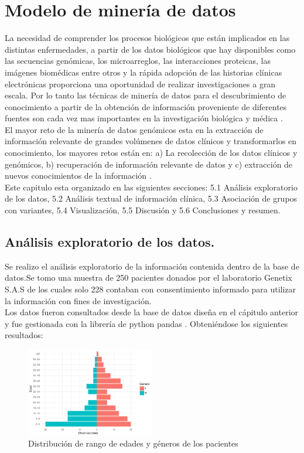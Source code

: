 \chapter{Modelo de minería de datos}

La necesidad de comprender los procesos biológicos que están implicados en las distintas enfermedades, a partir de los datos biológicos que hay disponibles como las secuencias genómicas, los microarreglos, las interacciones proteicas, las imágenes biomédicas entre otros y la rápida adopción de las historias clínicas electrónicas proporciona una oportunidad de realizar investigaciones a gran escala. Por lo tanto las técnicas de minería de datos para el descubrimiento de conocimiento a partir de la obtención de información proveniente de diferentes fuentes son cada vez mas importantes en la investigación biológica y médica \cite{Wang2017}.\\

El mayor reto de la minería de datos genómicos esta en la extracción de información relevante de grandes volúmenes de datos clínicos y transformarlos en conocimiento, los mayores retos están en: a) La recolección de los datos clínicos y genómicos, b) recuperación de información relevante de datos y c) extracción de nuevos conocimientos de la información \cite{Farid2016}. \\  


Este capitulo esta organizado en las siguientes secciones: 5.1 Análisis exploratorio de los datos, 5.2 Análisis textual de información clínica, 5.3 Asociación de grupos con variantes, 5.4 Visualización, 5.5 Discusión y 5.6 Conclusiones y resumen. 

\section{Análisis exploratorio de los datos.}

Se realizo el análisis exploratorio de la información contenida dentro de la base de datos.Se tomo una muestra de 250 pacientes donados por el laboratorio Genetix S.A.S de los cuales solo 228 contaban con consentimiento informado para utilizar la información con fines de investigación.\\

Los datos fueron consultados desde la base de datos diseña en el cápitulo anterior y fue gestionada con la librería de python pandas \cite{mckinneypandas}. Obteniéndose los siguientes resultados:

\begin{figure}[h!]
	\centering
	\includegraphics[width=0.5\textwidth]{Kap4/general}
	\caption{Distribución de rango de edades y géneros de los pacientes}
	\label{fig:general}
\end{figure}


